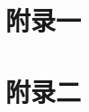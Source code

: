 \documentclass[oneside]{ctexart}
\begin{document}
\theendnotes

\begin{appendices}
    \section{附录一}
    \section{附录二}
\end{appendices}
\end{document}
